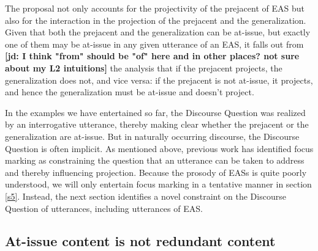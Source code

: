 \documentclass[11pt,fleqn]{article}
\newcommand{\6}{\mbox{$[\hspace*{-.6mm}[$}}
\newcommand{\9}{\mbox{$]\hspace*{-.6mm}]$}}
\newcommand{\jd}[1]{\textbf{\color{red}[jd: #1]}}
\begin{document}
The proposal not only accounts for the projectivity of the prejacent of EAS but also for the interaction in the projection of the prejacent and the generalization. Given that both the prejacent and the generalization can be at-issue, but exactly one of them may be at-issue in any given utterance of an EAS, it falls out from \jd{I think "from" should be "of" here and in other places? not sure about my L2 intuitions} the analysis that if the prejacent projects, the generalization does not, and vice versa: if the prejacent is not at-issue, it projects, and hence the generalization must be at-issue and doesn't project.

In the examples we have entertained so far, the Discourse Question was realized by an interrogative utterance, thereby making clear whether the prejacent or the generalization are at-issue. But in naturally occurring discourse, the Discourse Question is often implicit. As mentioned above, previous work has identified focus marking as constraining the question that an utterance can be taken to address and thereby influencing projection. Because the prosody of EASs is quite poorly understood, we will only entertain focus marking in a tentative manner in section \ref{s5}. Instead, the next section identifies a novel constraint on the Discourse Question of utterances, including utterances of EAS.

\subsection{At-issue content is not redundant content}\label{s23}
\end{document}
